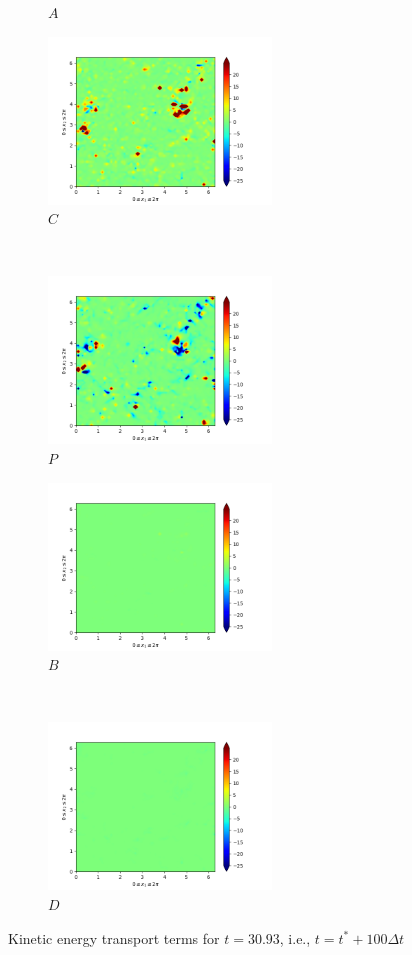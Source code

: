 \begin{figure}[H]
\begin{subfigure}{0.45\textwidth}
        \caption{$A$}
    \end{subfigure}
    \newline
    \begin{subfigure}{0.45\textwidth}
        \includegraphics[height=1.75in]{media/run-cds-65/C-ke-1440.png}
        \caption{$C$}
    \end{subfigure}
    ~
    \begin{subfigure}{0.45\textwidth}
        \includegraphics[height=1.75in]{media/run-cds-65/P-ke-1440.png}
        \caption{$P$}
    \end{subfigure}
    \newline
    \begin{subfigure}{0.45\textwidth}
        \includegraphics[height=1.75in]{media/run-cds-65/B-ke-1440.png}
        \caption{$B$}
    \end{subfigure}
    ~
    \begin{subfigure}{0.45\textwidth}
        \includegraphics[height=1.75in]{media/run-cds-65/D-ke-1440.png}
        \caption{$D$}
    \end{subfigure}
    \caption{Kinetic energy transport terms for $t=30.93$, i.e., $t=t^{\ast} + 100 \Delta t$}
\end{figure}

